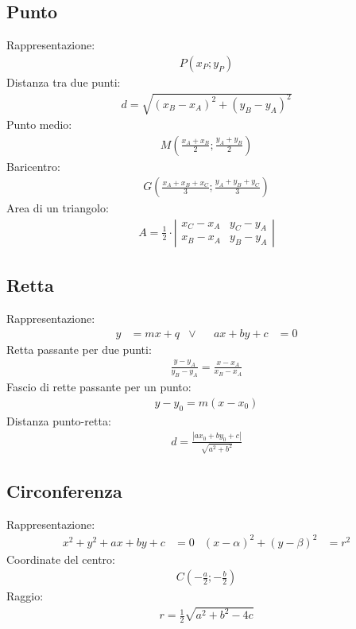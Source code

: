 \documentclass[a4paper]{article}
\begin{document}
	\subsection{Punto}
	Rappresentazione:
	\begin{align*}
		P(x_P;y_P)
	\end{align*}
	Distanza tra due punti:
	\begin{align*}
		d = \sqrt{(x_B -x _A)^2+(y_B - y_A)^2}
	\end{align*}
	Punto medio:
	\begin{align*}
		M \left( \frac{x_A + x_B}{2} ; \frac{y_A + y_B}{2} \right)
	\end{align*}
	Baricentro:
	\begin{align*}
		G \left( \frac{x_A + x_B + x_C}{3} ; \frac{y_A + y_B + y_C}{3} \right) 
	\end{align*}
	Area di un triangolo:
	\begin{align*}
		A = \frac{1}{2} \cdot \left| \begin{array}{cc}
		x_C-x_A & y_C-y_A \\ 
		x_B-x_A & y_B-y_A
		\end{array} \right|
	\end{align*}
	
	\subsection{Retta}
	Rappresentazione:
	\begin{align*}
		y &= mx + q		&\vee&&		ax + by + c & = 0
	\end{align*}
	Retta passante per due punti:
	\begin{align*}
		\frac{y-y_A}{y_B-y_A} = \frac{x-x_A}{x_B-x_A}
	\end{align*}
	Fascio di rette passante per un punto:
	\begin{align*}
		y-y_0 = m(x-x_0)
	\end{align*}
	Distanza punto-retta:
	\begin{align*}
		d = \frac{|ax_0+by_0+c|}{\sqrt{a^2+b^2}}
	\end{align*}
		
	\subsection{Circonferenza}
	Rappresentazione:
	\begin{align*}
		x^2+y^2+ax+by+c&=0	& (x-\alpha)^2 + (y-\beta)^2 &= r^2
	\end{align*}
	Coordinate del centro:
	\begin{align*}
		C \left( -\frac{a}{2} ; -\frac{b}{2} \right)
	\end{align*}
	Raggio:
	\begin{align*}
		r = \frac{1}{2}\sqrt{a^2+b^2-4c}
	\end{align*}
	
\end{document}
